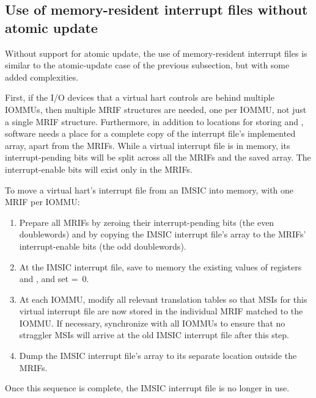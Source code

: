 \subsection{Use of memory-resident interrupt files without atomic update}

Without support for atomic update, the use of memory-resident interrupt
files is similar to the atomic-update case of the previous subsection,
but with some added complexities.

First, if the I/O devices that a virtual hart controls are behind
multiple \mbox{IOMMUs}, then multiple MRIF structures are needed, one per
\mbox{IOMMU}, not just a single MRIF structure.
Furthermore, in addition to locations for storing  and
, software needs a place for a complete copy of the
interrupt file's implemented  array, apart from the MRIFs.
While a virtual interrupt file is in memory, its interrupt-pending bits
will be split across all the MRIFs and the saved  array.
The interrupt-enable bits will exist only in the MRIFs.

To move a virtual hart's interrupt file from an IMSIC into memory, with
one MRIF per \mbox{IOMMU}:
\begin{enumerate}

\item
Prepare all MRIFs by zeroing their interrupt-pending bits (the even
doublewords) and by copying the IMSIC interrupt file's  array to
the MRIFs' interrupt-enable bits (the odd doublewords).

\item
At the IMSIC interrupt file, save to memory the existing values of
registers  and , and set 
=~0.

\item
At each \mbox{IOMMU}, modify all relevant translation tables so that MSIs
for this virtual interrupt file are now stored in the individual MRIF
matched to the \mbox{IOMMU}.
If necessary, synchronize with all \mbox{IOMMU}s to ensure that no straggler
MSIs will arrive at the old IMSIC interrupt file after this step.

\item
Dump the IMSIC interrupt file's  array to its separate location
outside the MRIFs.

\end{enumerate}
Once this sequence is complete, the IMSIC interrupt file is no longer
in use.

